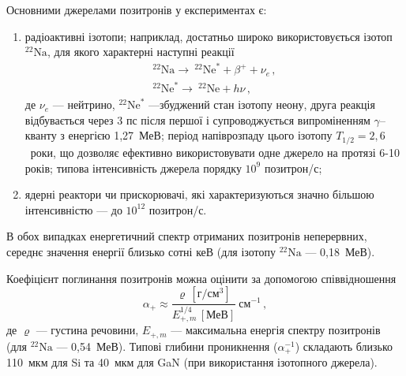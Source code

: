 \documentclass[10pt,a5paper,titlepage,oneside]{book}
\numberwithin{equation}{part}
\begin{document}
Основними джерелами позитронів у експериментах є:
\begin{enumerate}[label=\asbuk*),leftmargin=0em,itemindent=1.5em]
  \item радіоактивні ізотопи;
  наприклад, достатньо широко використовується ізотоп $^{22}\text{Na}$, для якого характерні наступні реакції
  \begin{gather*}
  ^{22}\text{Na}\rightarrow \:^{22}\text{Ne}^{*}+\beta^++\nu_e\,,\\
  ^{22}\text{Ne}^{*}\rightarrow \:^{22}\text{Ne}+h\nu\,,
  \end{gather*}
де
$\nu_e$ --- нейтрино,
$^{22}\text{Ne}^{*}$ ---збуджений стан ізотопу неону,
друга реакція відбувається через 3 пс після першої і супроводжується
випроміненням $\gamma$--кванту з енергією 1,27~МеВ;
період напіврозпаду цього ізотопу $T_{1/2}=2,6$~роки, що
дозволяє ефективно використовувати одне джерело на протязі 6-10 років;
 типова інтенсивність джерела порядку $10^9$ позитрон/с;
  \item ядерні реактори чи прискорювачі, які характеризуються значно більшою інтенсивністю --- до $10^{12}$ позитрон/с.
\end{enumerate}
В обох випадках енергетичний спектр отриманих позитронів неперервних,
середнє значення енергії близько сотні кеВ (для ізотопу $^{22}\text{Na}$ --- 0,18~МеВ).

Коефіцієнт поглинання позитронів можна оцінити за допомогою співвідношення \cite{PAS}
\begin{equation}
\alpha_+\approx\frac{\varrho\,\left[\text{г}/\text{см}^3\right]}{E_{+,m}^{1/4}\,[\text{МеВ}]}\:\text{см}^{-1}\,,
\end{equation}
де
$\varrho$ --- густина речовини,
$E_{+,m}$ --- максимальна енергія спектру позитронів (для $^{22}\text{Na}$ --- 0,54~МеВ).
Типові глибини проникнення ($\alpha^{-1}_+$) складають близько 110~мкм для Si та 40~мкм для GaN (при використання ізотопного джерела).
\end{document}
